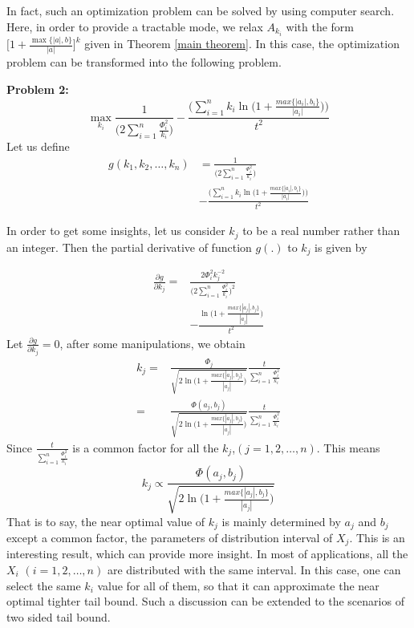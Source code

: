 \documentclass[journal]{IEEEtran}
\begin{document}
In fact, such an optimization problem can be solved by using computer search.
Here, in order to provide a tractable mode, we relax $A_{k_i}$ with the form $\Big[1+\frac{\max\{|a|,b\}}{|a|}\Big]^k$ given in Theorem \ref{main theorem}.
In this case, the optimization problem can be transformed into the following problem.

\textbf{Problem 2: }
\begin{equation}
\max\limits_{k_i}\frac{1}{\Big(2\sum_{i=1}^n \frac{\Phi_i^2}{k_i}\Big)}-\frac{\Big(\sum_{i=1}^n k_i\ln\big(1+\frac{max\{|a_i|,b_i\}}{|a_i|}\big)\Big)}{t^2}
\end{equation}
Let us define
\begin{equation}
\begin{split}
g(k_1,k_2,\dots,k_n){}&=\frac{1}{\Big(2\sum_{i=1}^n \frac{\Phi_i^2}{k_i}\Big)}{}\\
&-\frac{\Big(\sum_{i=1}^n k_i\ln\big(1+\frac{max\{|a_i|,b_i\}}{|a_i|}\big)\Big)}{t^2}
\end{split}
\end{equation}

In order to get some insights, let us consider $k_j$ to be a real number rather than an integer. Then
the partial derivative of function $g(.)$ to $k_j$ is given by

\begin{equation}
\begin{split}
\frac{\partial g}{\partial k_j}= {}&\frac{2\Phi_i^2k_j^{-2}}{\Big(2\sum_{i=1}^n \frac{\Phi_i^2}{k_i}\Big)^2}{}\\
&-\frac{\ln\big(1+\frac{max\{|a_j|,b_j\}}{|a_j|}\big)}{t^2}
\end{split}
\end{equation}
Let $\frac{\partial g}{\partial k_j}=0$, after some manipulations, we obtain
\begin{equation}
\begin{split}
k_j={}&\frac{\Phi_j}{\sqrt{2\ln\big(1+\frac{max\{|a_j|,b_j\}}{|a_j|}\big) }}\frac{t}{\sum_{i=1}^n \frac{\Phi_i^2}{k_i}}{}\\
=& \frac{\Phi(a_j,b_j)}{\sqrt{2\ln\big(1+\frac{max\{|a_j|,b_j\}}{|a_j|}\big) }}\frac{t}{\sum_{i=1}^n \frac{\Phi_i^2}{k_i}}
\end{split}
\end{equation}
Since $ \frac{t}{\sum_{i=1}^n \frac{\Phi_i^2}{k_i}}$ is a common factor for all the $k_j$,$(j=1,2,\dots,n)$. This means
\begin{equation}
k_j \propto \frac{\Phi(a_j,b_j)}{\sqrt{2\ln\big(1+\frac{max\{|a_j|,b_j\}}{|a_j|}\big) }}
\end{equation}
That is to say, the near optimal value of $k_j$ is mainly determined by $a_j$ and $b_j$ except a common factor, the  parameters of distribution interval of  $X_j$.
This is an interesting result, which can provide more insight. In most of applications, all the $X_i$ $(i=1,2,\dots, n)$ are distributed with the same interval. In this case, one can select the same $k_i$ value for all of them, so that it can approximate the near optimal tighter tail bound.
Such a discussion can be extended to the scenarios of two sided tail bound.
\end{document}
